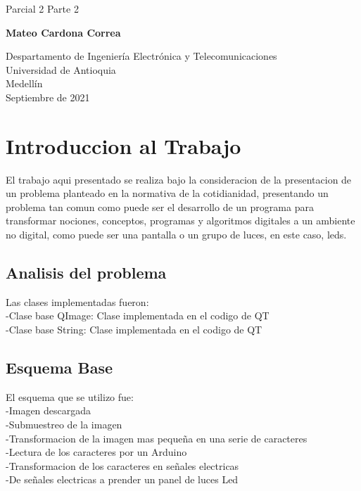 \documentclass{article}
\begin{document}
\begin{titlepage}
    \begin{center}
        \vspace*{1cm}
            
        \Huge
        \textbf{}
            
        \vspace{0.5cm}
        \LARGE
        Parcial 2 Parte 2
            
        \vspace{1.5cm}
            
        \textbf{Mateo Cardona Correa}
            
        \vfill
            
        \vspace{0.8cm}
            
        \Large
        Despartamento de Ingeniería Electrónica y Telecomunicaciones\\
        Universidad de Antioquia\\
        Medellín\\
        Septiembre de 2021
            
    \end{center}
\end{titlepage}

\tableofcontents
\newpage
\section{Introduccion al Trabajo}\label{intro}
El trabajo aqui presentado se realiza bajo la consideracion de la presentacion de un problema planteado en la normativa de la cotidianidad, presentando un problema tan comun como puede ser el desarrollo de un programa para transformar nociones, conceptos, programas y algoritmos digitales a un ambiente no digital, como puede ser una pantalla o un grupo de luces, en este caso, leds.
\subsection{Analisis del problema}\label{}
Las clases implementadas fueron:\\
-Clase base QImage: Clase implementada en el codigo de QT\\
-Clase base String: Clase implementada en el codigo de QT\\
\subsection{Esquema Base}\label{}
El esquema que se utilizo fue:\\
-Imagen descargada\\
-Submuestreo de la imagen\\
-Transformacion de la imagen mas pequeña en una serie de caracteres\\
-Lectura de los caracteres por un Arduino\\
-Transformacion de los caracteres en señales electricas\\
-De señales electricas a prender un panel de luces Led
\newpage
\end{document}
